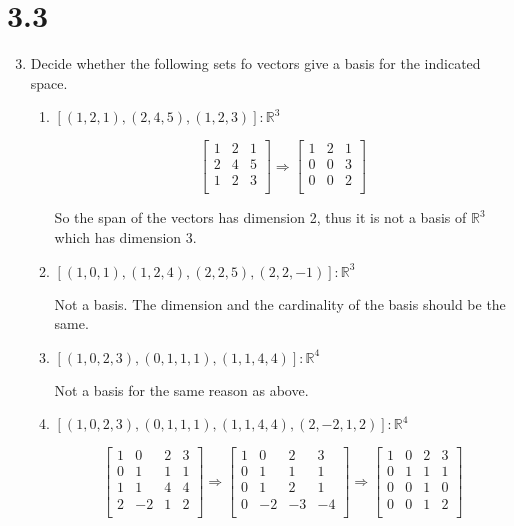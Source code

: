 \documentclass[letterpaper]{article}
\begin{document}
\section*{3.3}
\begin{enumerate}
\setcounter{enumi}{2}
\item
Decide whether the following sets fo vectors give a basis for the indicated space.
  \begin{enumerate}
  \item
  $[(1,2,1),(2,4,5),(1,2,3)]:\mathbb{R}^3$

  \[
  \left[\begin{array}{rrr}
  1&2&1\\
  2&4&5\\
  1&2&3\\
  \end{array}\right]
  \Rightarrow
  \left[\begin{array}{rrr}
  1&2&1\\
  0&0&3\\
  0&0&2\\
  \end{array}\right]
  \]

  So the span of the vectors has dimension 2, thus it is not a basis of $\mathbb{R}^3$ which has dimension 3.
  \item
  $[(1,0,1),(1,2,4),(2,2,5),(2,2,-1)]:\mathbb{R}^3$

  Not a basis. The dimension and the cardinality of the basis should be the same.
  \item
  $[(1,0,2,3),(0,1,1,1),(1,1,4,4)]:\mathbb{R}^4$

  Not a basis for the same reason as above.
  \item
  $[(1,0,2,3),(0,1,1,1),(1,1,4,4),(2,-2,1,2)]:\mathbb{R}^4$

  \[
  \left[\begin{array}{rrrr}
  1&0&2&3\\
  0&1&1&1\\
  1&1&4&4\\
  2&-2&1&2\\
  \end{array}\right]
  \Rightarrow
  \left[\begin{array}{rrrr}
  1&0&2&3\\
  0&1&1&1\\
  0&1&2&1\\
  0&-2&-3&-4\\
  \end{array}\right]
  \Rightarrow
  \left[\begin{array}{rrrr}
  1&0&2&3\\
  0&1&1&1\\
  0&0&1&0\\
  0&0&1&2\\
  \end{array}\right]
  \]


\end{enumerate}
\end{enumerate}
\end{document}
